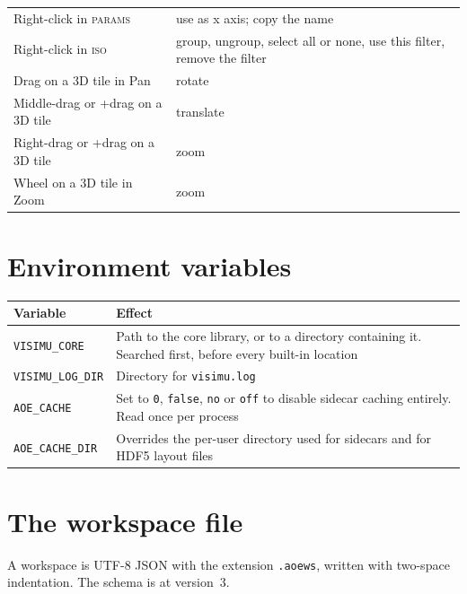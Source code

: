 \documentclass[11pt,a4paper,oneside]{report}
\newcommand{\code}[1]{\texttt{#1}}
\newcommand{\key}[1]{\textsf{\small\fbox{#1}}}
\newcommand{\tab}[1]{\textsc{#1}}
\begin{document}
\begin{center}
\begin{longtable}{@{}p{}p{}@{}}
Right-click in \tab{params} & use as x axis; copy the name \\
Right-click in \tab{iso} & group, ungroup, select all or none, use this filter, remove the filter \\
Drag on a 3D tile in Pan & rotate \\
Middle-drag or \key{Shift}+drag on a 3D tile & translate \\
Right-drag or \key{Ctrl}+drag on a 3D tile & zoom \\
Wheel on a 3D tile in Zoom & zoom \\
\bottomrule
\end{longtable}
\end{center}

\chapter{Environment variables}

\begin{center}
\small
\begin{tabular}{@{}p{}p{}@{}}
\toprule
\textbf{Variable} & \textbf{Effect} \\
\midrule
\code{VISIMU\_CORE} & Path to the core library, or to a directory containing it. Searched first, before every built-in location \\
\code{VISIMU\_LOG\_DIR} & Directory for \code{visimu.log} \\
\code{AOE\_CACHE} & Set to \code{0}, \code{false}, \code{no} or \code{off} to disable sidecar caching entirely. Read once per process \\
\code{AOE\_CACHE\_DIR} & Overrides the per-user directory used for sidecars and for HDF5 layout files \\
\bottomrule
\end{tabular}
\end{center}

\chapter{The workspace file}
\label{app:workspace}

A workspace is UTF-8 JSON with the extension \code{.aoews}, written with
two-space indentation. The schema is at version~3.
\end{document}
